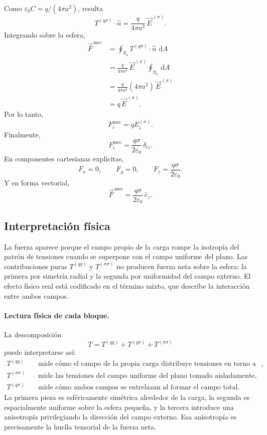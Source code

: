\documentclass{article}
\numberwithin{equation}{section}
\newcommand{\dd}{\,\mathrm{d}}
\newcommand{\Eext}{\vec E^{\,(\sigma)}}
\newcommand{\Fvec}{\vec F^{\,\mathrm{mec}}}
\begin{document}
Como $\varepsilon_0C=q/(4\pi a^2)$, resulta
\begin{equation}
T^{(q\sigma)}\cdot\hat n=\frac{q}{4\pi a^2}\,\Eext.
\end{equation}
Integrando sobre la esfera,
\begin{align}
\Fvec
&=\oint_{S_a}T^{(q\sigma)}\cdot\hat n\,\dd A\\
&=\frac{q}{4\pi a^2}\,\Eext\oint_{S_a}\dd A\\
&=\frac{q}{4\pi a^2}(4\pi a^2)\,\Eext\\
&=q\,\Eext.
\end{align}
Por lo tanto,
\begin{equation}
    F_i^{\mathrm{mec}}=qE_i^{(\sigma)}.
\end{equation}
Finalmente,
\begin{equation}
    F_i^{\mathrm{mec}}=\frac{q\sigma}{2\varepsilon_0}\,\delta_{iz}.
\end{equation}
En componentes cartesianas explícitas,
\begin{equation}
    F_x=0,\qquad F_y=0,\qquad F_z=\frac{q\sigma}{2\varepsilon_0}.
\end{equation}
Y en forma vectorial,
\begin{equation}
    \Fvec=\frac{q\sigma}{2\varepsilon_0}\,\hat e_z.
\end{equation}

\subsection{Interpretación física}

La fuerza aparece porque el campo propio de la carga rompe la isotropía del patrón de tensiones cuando se superpone con el campo uniforme del plano. Las contribuciones puras $T^{(qq)}$ y $T^{(\sigma\sigma)}$ no producen fuerza neta sobre la esfera: la primera por simetría radial y la segunda por uniformidad del campo externo. El efecto físico real está codificado en el término mixto, que describe la interacción entre ambos campos.


\paragraph{Lectura física de cada bloque.}
La descomposición
\[
T=T^{(qq)}+T^{(q\sigma)}+T^{(\sigma\sigma)}
\]
puede interpretarse así:
\begin{align*}
T^{(qq)} &\quad \text{mide cómo el campo de la propia carga distribuye tensiones en torno a ella},\\
T^{(\sigma\sigma)} &\quad \text{mide las tensiones del campo uniforme del plano tomado aisladamente},\\
T^{(q\sigma)} &\quad \text{mide cómo ambos campos se entrelazan al formar el campo total}.
\end{align*}
La primera pieza es esféricamente simétrica alrededor de la carga, la segunda es espacialmente uniforme sobre la esfera pequeña, y la tercera introduce una anisotropía privilegiando la dirección del campo externo. Esa anisotropía es precisamente la huella tensorial de la fuerza neta.
\end{document}
